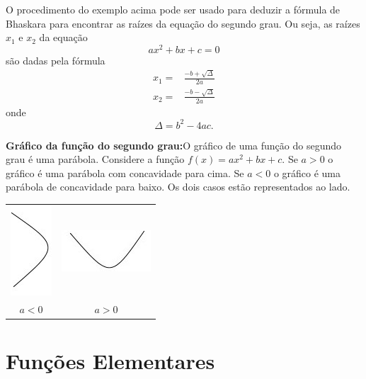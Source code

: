 O procedimento do exemplo acima pode ser usado para deduzir a fórmula de Bhaskara para encontrar
as raízes da equação do segundo grau. Ou seja, as raízes $x_{1}$ e $x_{2}$ da equação
\[
ax^{2}+bx+c=0
\]
são dadas pela fórmula
\begin{align*}
x_{1}= & \frac{-b+\sqrt{\Delta}}{2a}\\
x_{2}= & \frac{-b-\sqrt{\Delta}}{2a}
\end{align*}
onde
\[
\Delta=b^{2}-4ac.
\]

\begin{center}
\end{center}

\begin{multicols}{2}

\noindent \textbf{Gráfico da função do segundo grau:}O gráfico de uma função do segundo grau é uma parábola. Considere a função
$f(x)=ax^2+bx+c$. Se $a>0$ o gráfico é uma parábola com concavidade para cima. Se $a<0$ o gráfico é uma parábola de concavidade para baixo. Os dois casos estão representados ao lado.

\columnbreak

\begin{center}
\begin{tabular}{cc}
\includegraphics{./chapters/preliminares/imgs/SadHappy.jpg} & \includegraphics{./chapters/preliminares/imgs/Happy.jpg} \\
$a<0$ & $a>0$
\end{tabular}
\end{center}
\end{multicols}

\section{Funções Elementares}

